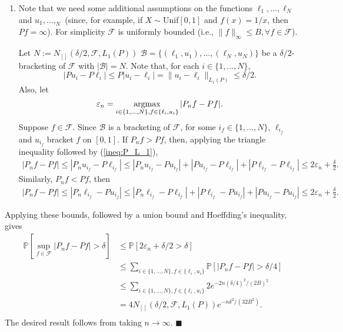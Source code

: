 \documentclass[11pt]{article}
\renewcommand{\qed}{\quad \ensuremath{\blacksquare}}
\newcommand{\F}{\mathcal{F}}
\newcommand{\Fc}{\mathscr{F}} %
\newcommand{\pr}{\mathbb{P}} %
\newcommand{\B}{\mathscr{B}}
\newcommand{\e}{\varepsilon} %
\newcommand{\argmax}{\operatornamewithlimits{argmax}}
\begin{document}
\begin{enumerate}
\begin{enumerate}
\item Note that we need some additional assumptions on the functions
$\ell_1,\dots,\ell_N$ and $u_1,\dots,_N$ (since, for example, if
$X \sim$Unif$[0,1]$ and $f(x) = 1/x$, then $P f = \infty$). For simplicity
$\Fc$ is uniformly bounded (i.e., $\|f\|_\infty \leq B, \forall f \in \Fc$).

Let $N := N_{[]}(\delta/2,\Fc,L_1(P))$
$\B = \{(\ell_1,u_1),\dots,(\ell_N,u_N)\}$ be a $\delta/2$-bracketing of $\Fc$
with $|\B| = N$. Note that, for each $i \in \{1,\dots,N\}$,
\begin{equation}
|P u_i - P \ell_i|
    \leq P|u_i - \ell_i|
    = \|u_i - \ell_i\|_{L_1(P)}
    \leq \delta/2.
\label{ineq:P_L_1}
\end{equation}
Also, let
\[\e_n = \argmax_{i \in \{1,\dots,N\}, f \in \{\ell_i,u_i\}}
    |P_n f - P f|.\]
Suppose $f \in \F$. Since $\B$ is a bracketing of $\Fc$, for some
$i_f \in \{1,\dots,N\}$, $\ell_{i_f}$ and $u_{i_f}$ bracket $f$ on
$[0,1]$. If $P_n f > P f$, then, applying the triangle inequality followed by
(\ref{ineq:P_L_1}),
\begin{align*}
|P_n f - P f|
    \leq |P_n u_{i_f} - P \ell_{i_f}|
    \leq |P_n u_{i_f} - P u_{i_f}| + |P u_{i_f} - P \ell_{i_f}|
                                        + |P \ell_{i_f} - P \ell_{i_f}|
    \leq 2\e_n + \frac{\delta}{2}.
\end{align*}
Similarly, $P_n f < P f$, then
\begin{align*}
|P_n f - P f|
    \leq |P_n \ell_{i_f} - P u_{i_f}|
    \leq |P_n \ell_{i_f} - P \ell_{i_f}| + |P \ell_{i_f} - P u_{i_f}|
                                        + |P u_{i_f} - P u_{i_f}|
    \leq 2\e_n + \frac{\delta}{2}.
\end{align*}
\end{enumerate}
Applying these bounds, followed by a union bound and Hoeffding's inequality,
gives
\begin{align*}
\pr\left[ \sup_{f \in \Fc} |P_n f - P f| > \delta \right]
 &  \leq \pr\left[ 2\e_n + \delta/2 > \delta \right]    \\
 &  \leq \sum_{i \in \{1,\dots,N\},f \in \{\ell_i,u_i\}}
        \pr\left[ |P_n f - P f| > \delta/4 \right]    \\
 &  \leq \sum_{i \in \{1,\dots,N\},f \in \{\ell_i,u_i\}}
        2e^{-2n(\delta/4)^2/(2B)^2}   \\
 &  = 4N_{[]}(\delta/2,\Fc,L_1(P)) e^{-n\delta^2/(32B^2)}.   \\
\end{align*}
The desired result follows from taking $n \to \infty$. \qed
\end{enumerate}
\end{document}
